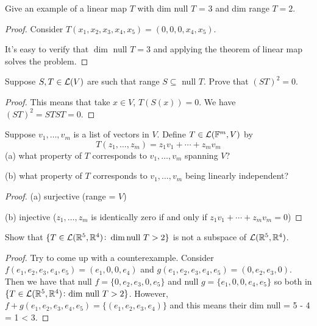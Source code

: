 \documentclass{extarticle}
\begin{document}
\begin{problem}{1}
    Give an example of a linear map \(T\) with dim null \(T\) = 3 and dim range \(T = 2\). 
\end{problem}

\begin{proof}
Consider \(T(x_1, x_2, x_3, x_4, x_5) = (0,0,0,x_4,x_5)\). 

It's easy to verify that \(\dim\) null \(T = 3\) and applying the theorem of linear map solves the problem.
\end{proof}


\begin{problem}{2}
    Suppose \(S, T \in \mathcal{L}(V)\) are such that range \(S \subseteq \) null \(T\). Prove that 
    \((ST)^2 = 0\).
\end{problem}

\begin{proof}
This means that take \(x \in V\), \(T (S(x)) = 0 \). We have \((ST)^2 = STST = 0\). 
\end{proof}

\begin{problem}{3}
    Suppose \(v_1, \ldots, v_m\) is a list of vectors in \(V\). Define 
    \(T \in \mathcal{L} (\mathbb{F}^m, V)\) by 
    \[T(z_1, \ldots, z_m) = z_1 v_1 + \cdots + z_m v_m\]
    (a) what property of \(T\) corresponds to \(v_1, \ldots, v_m\) spanning 
    \(V\)?

    (b) what property of \(T\) corresponds to \(v_1, \ldots, v_m\) being linearly 
    independent?
\end{problem}


\begin{proof}
(a) surjective (range = \(V\)) 

(b) injective (\(z_1, \ldots, z_m \) is identically zero if and only if 
\(z_1 v_1 + \cdots + z_m v_m = 0\))
\end{proof}


\begin{problem}{4}
    Show that \(\{T \in \mathcal{L}(\mathbb{R}^5, \mathbb{R}^4) \colon \dim \text{null } T > 2\}\)
    is not a subspace of \(\mathcal{L}(\mathbb{R}^5, \mathbb{R}^4)\).
\end{problem}


\begin{proof}
Try to come up with a counterexample. Consider \(f(e_1, e_2, e_3, e_4, e_5)
= (e_1, 0,0, e_4)\) and \(g(e_1, e_2, e_3, e_4, e_5) = (0, e_2, e_3, 0)\). Then 
we have that null \(f = \{0,e_2,e_3,0,e_5\}\) and null \(g = \{e_1, 0, 0, e_4, e_5\}\)
so both in \(\{T \in \mathcal{L}(\mathbb{R}^5, \mathbb{R}^4) \colon \text{dim null } T > 2\}\). However,
\(f + g (e_1, e_2, e_3, e_4, e_5) = \{(e_1,e_2,e_3,e_4)\}\) and this means 
their dim null = 5 - 4 = 1 < 3. 

\end{proof}
\end{document}
